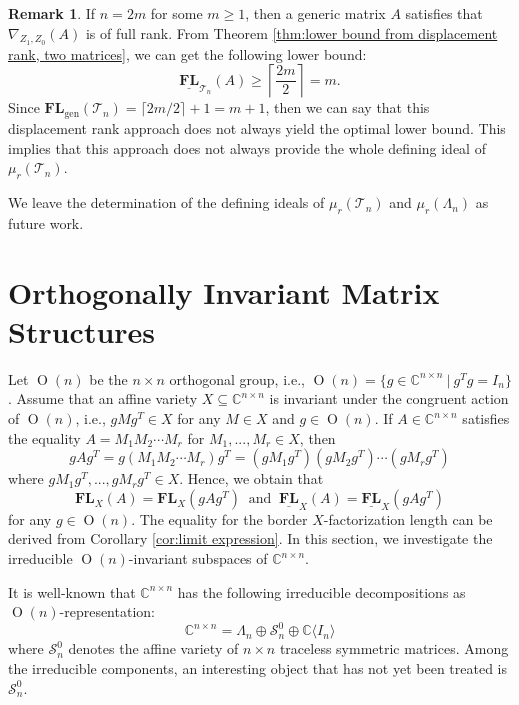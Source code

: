 \documentclass[reqno]{amsart}
\theoremstyle{definition}
\newtheorem{remark}[theorem]{Remark}
\numberwithin{equation}{section}
\begin{document}
\begin{remark}
    If $n=2m$ for some $m \geq 1$, then a generic matrix $A$ satisfies that $\nabla_{Z_1,Z_0}(A)$ is of full rank. From Theorem \ref{thm:lower bound from displacement rank, two matrices}, we can get the following lower bound:
    \begin{equation*}
        \underline{\mathbf{FL}}_{\mathcal{T}_n}(A) \geq \left\lceil \frac{2m}{2} \right\rceil=m.
    \end{equation*}
    Since $\mathbf{FL}_{\text{gen}}(\mathcal{T}_n)=\lceil 2m/2\rceil+1=m+1$, then we can say that this displacement rank approach does not always yield the optimal lower bound. This implies that this approach does not always provide the whole defining ideal of $\mu_r(\mathcal{T}_n)$.
\end{remark}

We leave the determination of the defining ideals of $\mu_r(\mathcal{T}_n)$ and $\mu_r(\Lambda_n)$ as future work.

\section{Orthogonally Invariant Matrix Structures}\label{section:Orthogonally Invariant Matrix Structures}

Let $\operatorname{O}(n)$ be the $n \times n$ orthogonal group, i.e., $\operatorname{O}(n)=\{g \in \mathbb{C}^{n \times n}~|~g^Tg=I_n\}$. Assume that an affine variety $X \subseteq \mathbb{C}^{n\times n}$ is invariant under the congruent action of $\operatorname{O}(n)$, i.e., $g M g^T \in X$ for any $M \in X$ and $g \in \operatorname{O}(n)$. If $A \in \mathbb{C}^{n \times n}$ satisfies the equality $A=M_1M_2\cdots M_r$ for $M_1,...,M_r \in X$, then 
\begin{equation*}
    gAg^T=g(M_1M_2\cdots M_r)g^T=(gM_1g^T)(gM_2g^T)\cdots(gM_rg^T)
\end{equation*}
where $gM_1g^T,...,gM_rg^T \in X$. Hence, we obtain that
\begin{equation*}
    \mathbf{FL}_X(A)=\mathbf{FL}_X(gAg^T)~\text{ and }~\underline{\mathbf{FL}}_X(A)=\underline{\mathbf{FL}}_X(gAg^T)
\end{equation*}
for any $g \in \operatorname{O}(n)$. The equality for the border $X$-factorization length can be derived from Corollary \ref{cor:limit expression}. In this section, we investigate the irreducible $\operatorname{O}(n)$-invariant subspaces of $\mathbb{C}^{n \times n}$.

It is well-known that $\mathbb{C}^{n \times n}$ has the following irreducible decompositions as $\operatorname{O}(n)$-representation:
\begin{equation*}
    \mathbb{C}^{n \times n}=
        \Lambda_n \oplus \mathcal{S}_n^0 \oplus \mathbb{C}\langle I_n \rangle
\end{equation*}
where $\mathcal{S}_n^0$ denotes the affine variety of $n \times n$ traceless symmetric matrices. Among the irreducible components, an interesting object that has not yet been treated is $\mathcal{S}_n^0$.
\end{document}
